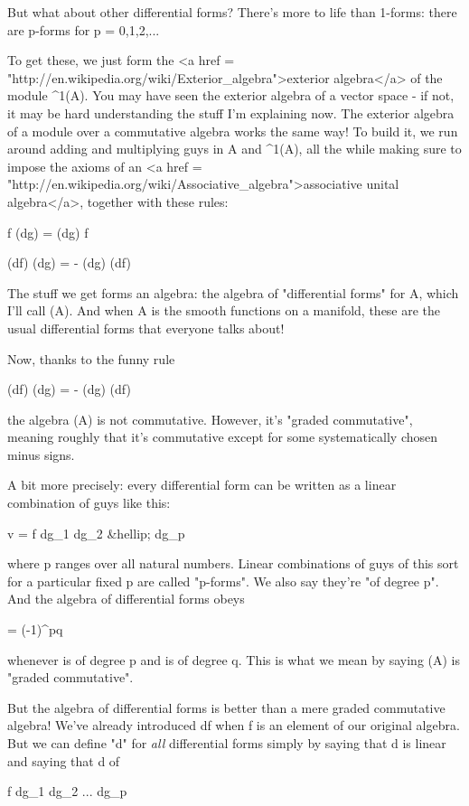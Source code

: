 But what about other differential forms?  There's more to life than
1-forms: there are p-forms for p = 0,1,2,...  

To get these, we just form the <a href =
"http://en.wikipedia.org/wiki/Exterior_algebra">exterior algebra</a>
of the module \Omega ^{1}(A).  You may have seen the exterior
algebra of a vector space - if not, it may be hard understanding the
stuff I'm explaining now.  The exterior algebra of a module over a
commutative algebra works the same way!  To build it, we run around
adding and multiplying guys in A and \Omega ^{1}(A), all the
while making sure to impose the axioms of an <a href =
"http://en.wikipedia.org/wiki/Associative_algebra">associative unital
algebra</a>, together with these rules:

f (dg) = (dg) f

(df) (dg) = - (dg) (df)

The stuff we get forms an algebra: the algebra of "differential forms"
for A, which I'll call \Omega (A).  And when A is the smooth functions
on a manifold, these are the usual differential forms that everyone
talks about!

Now, thanks to the funny rule 

(df) (dg) = - (dg) (df)

the algebra \Omega (A) is not commutative.  However, it's "graded
commutative", meaning roughly that it's commutative except for some
systematically chosen minus signs.

A bit more precisely: every differential form can be written as a
linear combination of guys like this:

v = f dg_{1} dg_{2} &hellip; dg_{p}

where p ranges over all natural numbers.  Linear combinations of guys
of this sort for a particular fixed p are called "p-forms".
We also say they're "of degree p".  And the algebra of
differential forms obeys

\nu \omega  = (-1)^{pq} \omega \nu 

whenever \nu  is of degree p and \omega  is of degree q.  This is what we
mean by saying \Omega (A) is "graded commutative".

But the algebra of differential forms is better than a mere graded
commutative algebra!  We've already introduced df when f is an element
of our original algebra.  But we can define "d" for \emph{all}
differential forms simply by saying that d is linear and saying that d
of

f dg_{1} dg_{2} ... dg_{p}

